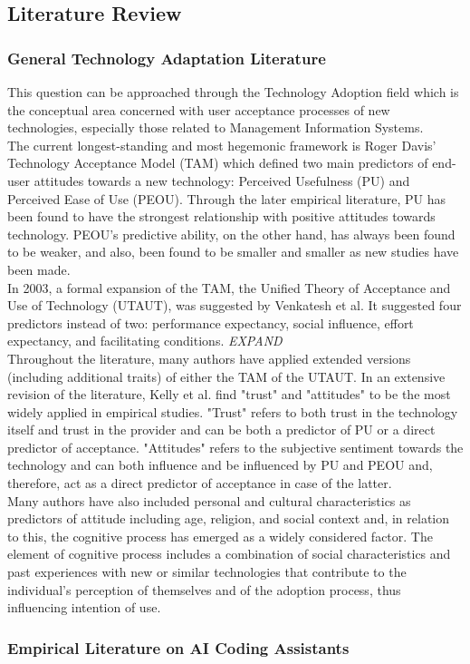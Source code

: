 \subsection{Literature Review}
\subsubsection{General Technology Adaptation Literature}
This question can be approached through the Technology Adoption field which is the conceptual area concerned with user acceptance processes of new technologies, especially those related to Management Information Systems. \\

The current longest-standing and most hegemonic framework is Roger Davis' Technology Acceptance Model (TAM) which defined two main predictors of end-user attitudes towards a new technology: Perceived Usefulness (PU) and Perceived Ease of Use (PEOU). Through the later empirical literature, PU has been found to have the strongest relationship with positive attitudes towards technology. PEOU's predictive ability, on the other hand, has always been found to be weaker, and also, been found to be smaller and smaller as new studies have been made. \\

In 2003, a formal expansion of the TAM, the Unified Theory of Acceptance and Use of Technology (UTAUT), was suggested by Venkatesh et al. It suggested four predictors instead of two: performance expectancy, social influence, effort expectancy, and facilitating conditions. \textit{EXPAND} \\

Throughout the literature, many authors have applied extended versions (including additional traits) of either the TAM of the UTAUT. In an extensive revision of the literature, Kelly et al. find "trust" and "attitudes" to be the most widely applied in empirical studies. "Trust" refers to both trust in the technology itself and trust in the provider and can be both a predictor of PU or a direct predictor of acceptance. "Attitudes" refers to the subjective sentiment towards the technology and can both influence and be influenced by PU and PEOU and, therefore, act as a direct predictor of acceptance in case of the latter. \\

Many authors have also included personal and cultural characteristics as predictors of attitude including age, religion, and social context and, in relation to this, the cognitive process has emerged as a widely considered factor. The element of cognitive process includes a combination of social characteristics and past experiences with new or similar technologies that contribute to the individual's perception of themselves and of the adoption process, thus influencing intention of use. 

\subsubsection{Empirical Literature on AI Coding Assistants}


